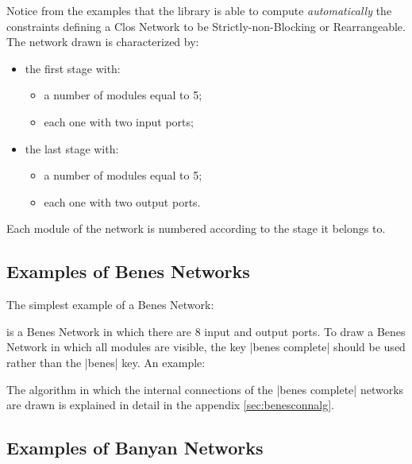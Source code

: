 \documentclass{ltxdoc}
\begin{document}
Notice from the examples that the library is able to compute \textit{automatically} the constraints defining a Clos Network to be Strictly-non-Blocking or Rearrangeable. The network drawn is characterized by:
\begin{itemize}
\item the first stage with:
\begin{itemize}
\item a number of modules equal to 5;
\item each one with two input ports;
\end{itemize}
\item the last stage with:
\begin{itemize}
\item a number of modules equal to 5;
\item each one with two output ports.
\end{itemize}
\end{itemize}
Each module of the network is numbered according to the stage it belongs to.

\subsection{Examples of Benes Networks}

The simplest example of a Benes Network:
\begin{codeexample}[]
\begin{tikzpicture}
    \node[benes] {};
\end{tikzpicture}
\end{codeexample}
is a Benes Network in which there are 8 input and output ports. To draw a Benes Network in which all modules are visible, the key |benes complete| should be used rather than the |benes| key. An example:

\begin{codeexample}[]
\end{codeexample}

The algorithm in which the internal connections of the |benes complete| networks are drawn is explained in detail in the appendix \ref{sec:benesconnalg}.

\subsection{Examples of Banyan Networks}
\end{document}
